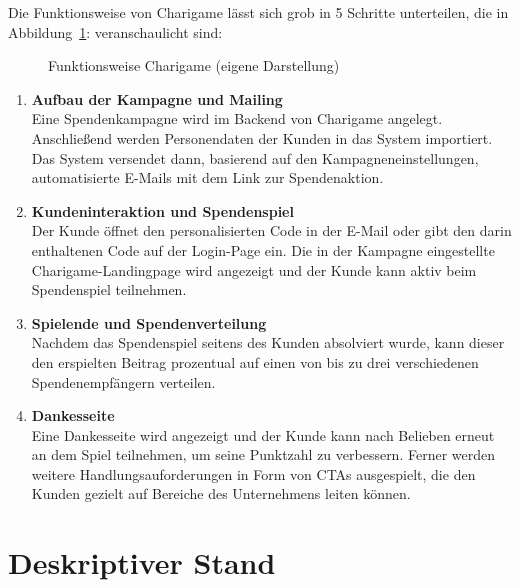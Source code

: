 Die Funktionsweise von Charigame lässt sich grob in 5 Schritte unterteilen, die in Abbildung~\ref{fig:charigame-funktion}: veranschaulicht sind:

\begin{figure}[H]
    \centering
    
    \caption{Funktionsweise Charigame (eigene Darstellung)}
    \label{fig:charigame-funktion}
\end{figure}

\begin{enumerate}
    \item \textbf{Aufbau der Kampagne und Mailing}
    \\ Eine Spendenkampagne wird im Backend von Charigame angelegt.
    Anschließend werden Personendaten der Kunden in das System importiert.
    Das System versendet dann, basierend auf den Kampagneneinstellungen, automatisierte E-Mails mit dem Link zur Spendenaktion.
    \item \textbf{Kundeninteraktion und Spendenspiel}
    \\ Der Kunde öffnet den personalisierten Code in der E-Mail oder gibt den darin enthaltenen Code auf der Login-Page ein.
    Die in der Kampagne eingestellte Charigame-Landingpage wird angezeigt und der Kunde kann aktiv beim Spendenspiel teilnehmen.
    \item \textbf{Spielende und Spendenverteilung}
    \\ Nachdem das Spendenspiel seitens des Kunden absolviert wurde, kann dieser den erspielten Beitrag prozentual auf einen von bis zu drei verschiedenen Spendenempfängern verteilen.
    \item \textbf{Dankesseite}
    \\ Eine Dankesseite wird angezeigt und der Kunde kann nach Belieben erneut an dem Spiel teilnehmen, um seine Punktzahl zu verbessern.
    Ferner werden weitere Handlungsauforderungen in Form von CTAs ausgespielt, die den Kunden gezielt auf Bereiche des Unternehmens leiten können.
\end{enumerate}

\section{Deskriptiver Stand}

